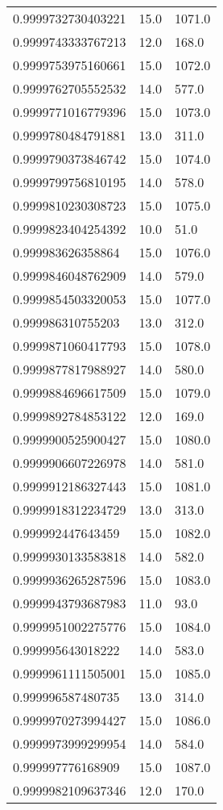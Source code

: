 \begin{center}
\begin{supertabular}[H]{p{0.30\textwidth}p{0.05\textwidth}p{0.05\textwidth}}
0.9999732730403221 & 15.0 & 1071.0 \\ 
0.9999743333767213 & 12.0 & 168.0 \\ 
0.9999753975160661 & 15.0 & 1072.0 \\ 
0.9999762705552532 & 14.0 & 577.0 \\ 
0.9999771016779396 & 15.0 & 1073.0 \\ 
0.9999780484791881 & 13.0 & 311.0 \\ 
0.9999790373846742 & 15.0 & 1074.0 \\ 
0.9999799756810195 & 14.0 & 578.0 \\ 
0.9999810230308723 & 15.0 & 1075.0 \\ 
0.9999823404254392 & 10.0 & 51.0 \\ 
0.999983626358864 & 15.0 & 1076.0 \\ 
0.9999846048762909 & 14.0 & 579.0 \\ 
0.9999854503320053 & 15.0 & 1077.0 \\ 
0.999986310755203 & 13.0 & 312.0 \\ 
0.9999871060417793 & 15.0 & 1078.0 \\ 
0.9999877817988927 & 14.0 & 580.0 \\ 
0.9999884696617509 & 15.0 & 1079.0 \\ 
0.9999892784853122 & 12.0 & 169.0 \\ 
0.9999900525900427 & 15.0 & 1080.0 \\ 
0.9999906607226978 & 14.0 & 581.0 \\ 
0.9999912186327443 & 15.0 & 1081.0 \\ 
0.9999918312234729 & 13.0 & 313.0 \\ 
0.999992447643459 & 15.0 & 1082.0 \\ 
0.9999930133583818 & 14.0 & 582.0 \\ 
0.9999936265287596 & 15.0 & 1083.0 \\ 
0.9999943793687983 & 11.0 & 93.0 \\ 
0.9999951002275776 & 15.0 & 1084.0 \\ 
0.999995643018222 & 14.0 & 583.0 \\ 
0.9999961111505001 & 15.0 & 1085.0 \\ 
0.999996587480735 & 13.0 & 314.0 \\ 
0.9999970273994427 & 15.0 & 1086.0 \\ 
0.9999973999299954 & 14.0 & 584.0 \\ 
0.999997776168909 & 15.0 & 1087.0 \\ 
0.9999982109637346 & 12.0 & 170.0 \\ 

\end{supertabular}
\end{center}
